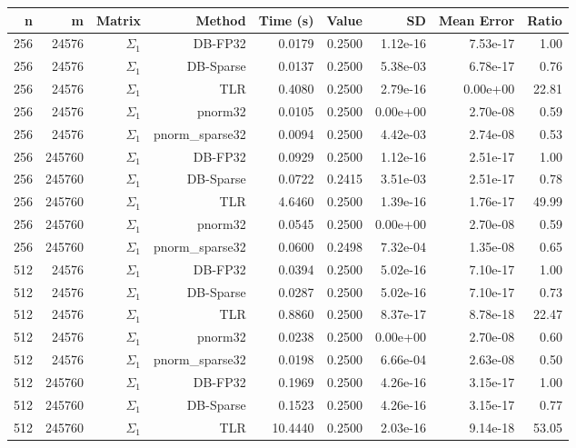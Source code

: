\begin{tabular}{|r|r|r|r|r|r|r|r|r|}
  \hline
  \textbf{n} & \textbf{m} & \textbf{Matrix} & \textbf{Method} & \textbf{Time (s)} & \textbf{Value} & \textbf{SD} & \textbf{Mean Error} & \textbf{Ratio} \\
  \hline
  256 & 24576 & $\Sigma_1$ & DB-FP32 & 0.0179 & 0.2500 & 1.12e-16 & 7.53e-17 & 1.00 \\
  256 & 24576 & $\Sigma_1$ & DB-Sparse & 0.0137 & 0.2500 & 5.38e-03 & 6.78e-17 & 0.76 \\
  256 & 24576 & $\Sigma_1$ & TLR & 0.4080 & 0.2500 & 2.79e-16 & 0.00e+00 & 22.81 \\
  256 & 24576 & $\Sigma_1$ & pnorm32 & 0.0105 & 0.2500 & 0.00e+00 & 2.70e-08 & 0.59 \\
  256 & 24576 & $\Sigma_1$ & pnorm\_sparse32 & 0.0094 & 0.2500 & 4.42e-03 & 2.74e-08 & 0.53 \\
  256 & 245760 & $\Sigma_1$ & DB-FP32 & 0.0929 & 0.2500 & 1.12e-16 & 2.51e-17 & 1.00 \\
  256 & 245760 & $\Sigma_1$ & DB-Sparse & 0.0722 & 0.2415 & 3.51e-03 & 2.51e-17 & 0.78 \\
  256 & 245760 & $\Sigma_1$ & TLR & 4.6460 & 0.2500 & 1.39e-16 & 1.76e-17 & 49.99 \\
  256 & 245760 & $\Sigma_1$ & pnorm32 & 0.0545 & 0.2500 & 0.00e+00 & 2.70e-08 & 0.59 \\
  256 & 245760 & $\Sigma_1$ & pnorm\_sparse32 & 0.0600 & 0.2498 & 7.32e-04 & 1.35e-08 & 0.65 \\
  512 & 24576 & $\Sigma_1$ & DB-FP32 & 0.0394 & 0.2500 & 5.02e-16 & 7.10e-17 & 1.00 \\
  512 & 24576 & $\Sigma_1$ & DB-Sparse & 0.0287 & 0.2500 & 5.02e-16 & 7.10e-17 & 0.73 \\
  512 & 24576 & $\Sigma_1$ & TLR & 0.8860 & 0.2500 & 8.37e-17 & 8.78e-18 & 22.47 \\
  512 & 24576 & $\Sigma_1$ & pnorm32 & 0.0238 & 0.2500 & 0.00e+00 & 2.70e-08 & 0.60 \\
  512 & 24576 & $\Sigma_1$ & pnorm\_sparse32 & 0.0198 & 0.2500 & 6.66e-04 & 2.63e-08 & 0.50 \\
  512 & 245760 & $\Sigma_1$ & DB-FP32 & 0.1969 & 0.2500 & 4.26e-16 & 3.15e-17 & 1.00 \\
  512 & 245760 & $\Sigma_1$ & DB-Sparse & 0.1523 & 0.2500 & 4.26e-16 & 3.15e-17 & 0.77 \\
  512 & 245760 & $\Sigma_1$ & TLR & 10.4440 & 0.2500 & 2.03e-16 & 9.14e-18 & 53.05 \\

\end{tabular}

